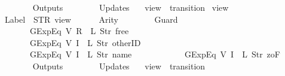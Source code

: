 \begin{isabellebody}
\ \ \ \ \ \ {\isacharbrackright}{\isacharcomma}\isanewline
\ \ \ \ \ \ Outputs\ {\isacharequal}\ {\isacharbrackleft}{\isacharbrackright}{\isacharcomma}\isanewline
\ \ \ \ \ \ Updates\ {\isacharequal}\ {\isacharbrackleft}{\isacharbrackright}\isanewline
{\isasymrparr}{\isachardoublequoteclose}\isanewline
\isanewline
{}\isamarkupfalse%
\ {\isachardoublequoteopen}view{}{\isachardoublequoteclose}\ {\isacharcolon}{\isacharcolon}\ {\isachardoublequoteopen}transition{\isachardoublequoteclose}\ \isanewline
{\isachardoublequoteopen}view{}\ {\isasymequiv}\ {\isasymlparr}\isanewline
\ \ \ \ \ \ Label\ {\isacharequal}\ STR\ {\isacharprime}{\isacharprime}view{\isacharprime}{\isacharprime}{\isacharcomma}\isanewline
\ \ \ \ \ \ Arity\ {\isacharequal}\ {}{\isacharcomma}\isanewline
\ \ \ \ \ \ Guard\ {\isacharequal}\ {\isacharbrackleft}\isanewline
\ \ \ \ \ \ \ \ \ \ \ \ GExp{\isachardot}Eq\ {\isacharparenleft}V\ {\isacharparenleft}R\ {}{\isacharparenright}{\isacharparenright}\ {\isacharparenleft}L\ {\isacharparenleft}Str\ {\isacharprime}{\isacharprime}free{\isacharprime}{\isacharprime}{\isacharparenright}{\isacharparenright}{\isacharcomma}\isanewline
\ \ \ \ \ \ \ \ \ \ \ \ GExp{\isachardot}Eq\ {\isacharparenleft}V\ {\isacharparenleft}I\ {}{\isacharparenright}{\isacharparenright}\ {\isacharparenleft}L\ {\isacharparenleft}Str\ {\isacharprime}{\isacharprime}otherID{\isacharprime}{\isacharprime}{\isacharparenright}{\isacharparenright}{\isacharcomma}\isanewline
\ \ \ \ \ \ \ \ \ \ \ \ GExp{\isachardot}Eq\ {\isacharparenleft}V\ {\isacharparenleft}I\ {}{\isacharparenright}{\isacharparenright}\ {\isacharparenleft}L\ {\isacharparenleft}Str\ {\isacharprime}{\isacharprime}name{\isacharprime}{\isacharprime}{\isacharparenright}{\isacharparenright}{\isacharcomma}\isanewline
\ \ \ \ \ \ \ \ \ \ \ \ GExp{\isachardot}Eq\ {\isacharparenleft}V\ {\isacharparenleft}I\ {}{\isacharparenright}{\isacharparenright}\ {\isacharparenleft}L\ {\isacharparenleft}Str\ {\isacharprime}{\isacharprime}{}zoF{\isacharprime}{\isacharprime}{\isacharparenright}{\isacharparenright}\isanewline
\ \ \ \ \ \ {\isacharbrackright}{\isacharcomma}\isanewline
\ \ \ \ \ \ Outputs\ {\isacharequal}\ {\isacharbrackleft}{\isacharbrackright}{\isacharcomma}\isanewline
\ \ \ \ \ \ Updates\ {\isacharequal}\ {\isacharbrackleft}{\isacharbrackright}\isanewline
{\isasymrparr}{\isachardoublequoteclose}\isanewline
\isanewline
{}\isamarkupfalse%
\ {\isachardoublequoteopen}view{}{\isachardoublequoteclose}\ {\isacharcolon}{\isacharcolon}\ {\isachardoublequoteopen}transition{\isachardoublequoteclose}\ \isanewline

\end{isabellebody}
